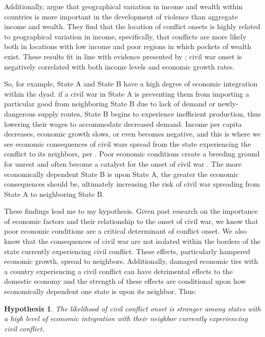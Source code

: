 \documentclass[12pt,letterpaper]{article}
\newtheorem{hyp}{Hypothesis}
\begin{document}
Additionally, \citet{Buhaugetal2011} argue that geographical variation in income and wealth within countries is more important in the development of violence than aggregate income and wealth. They find that the location of conflict onsets is highly related to geographical variation in income, specifically, that conflicts are more likely both in locations with low income and poor regions in which pockets of wealth exist. These results fit in line with evidence presented by \citet{FearonLaitin2003, CollierHoeffler1998, CollierHoeffler2004, MiguelSatyanathSergenti2004, BlattmanMiguel2010, DubeVargas2013}; civil war onset is negatively correlated with both income levels and economic growth rates.

So, for example, State A and State B have a high degree of economic integration within the dyad. if a civil war in State A is preventing them from importing a particular good from neighboring State B due to lack of demand or newly-dangerous supply routes, State B begins to experience inefficient production, thus lowering their wages to accommodate decreased demand. Income per capita decreases, economic growth slows, or even becomes negative, and this is where we see economic consequences of civil wars spread from the state experiencing the conflict to its neighbors, per \citet{MurdochSandler2002}. Poor economic conditions create a breeding ground for unrest and often become a catalyst for the onset of civil war \citep{CollierHoeffler2004}. The more economically dependent State B is upon State A, the greater the economic consequences should be, ultimately increasing the risk of civil war spreading from State A to neighboring State B.  
 
These findings lead me to my hypothesis. Given past research on the importance of economic factors and their relationship to the onset of civil war, we know that poor economic conditions are a critical determinant of conflict onset. We also know that the consequences of civil war are not isolated within the borders of the state currently experiencing civil conflict. These effects, particularly hampered economic growth, spread to neighbors. Additionally, damaged economic ties with a country experiencing a civil conflict can have detrimental effects to the domestic economy and the strength of these effects are conditional upon how economically dependent one state is upon its neighbor. Thus: 

\begin{hyp}The likelihood of civil conflict onset is stronger among states with a high level of economic integration with their neighbor currently experiencing civil conflict.\end{hyp}
\end{document}
